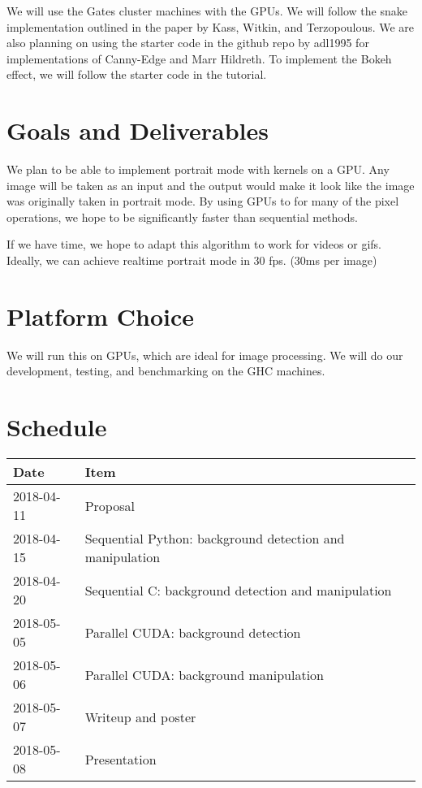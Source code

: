 \documentclass[12pt]{article}
\begin{document}
We will use the Gates cluster machines with the GPUs. We will follow the snake
implementation outlined in the paper by Kass, Witkin, and Terzopoulous.
\cite{paper} We are also planning on using the starter code in the github repo
by adl1995 for implementations of Canny-Edge and Marr Hildreth. \cite{edge} To
implement the Bokeh effect, we will follow the starter code in the tutorial.
\cite{bokeh}

\section{Goals and Deliverables}

We plan to be able to implement portrait mode with kernels on a GPU. Any image
will be taken as an input and the output would make it look like the image was
originally taken in portrait mode. By using GPUs to for many of the pixel
operations, we hope to be significantly faster than sequential methods.

If we have time, we hope to adapt this algorithm to work for videos or gifs.
Ideally, we can achieve realtime portrait mode in 30 fps. (30ms per image)

\section{Platform Choice}

We will run this on GPUs, which are ideal for image processing. We will do our
development, testing, and benchmarking on the GHC machines.

\section{Schedule}

\begin{tabular}{l|l}
    Date & Item \\
    \hline
    2018-04-11 & Proposal \\
    2018-04-15 & Sequential Python: background detection and manipulation \\
    2018-04-20 & Sequential C: background detection and manipulation \\
    2018-05-05 & Parallel CUDA: background detection \\
    2018-05-06 & Parallel CUDA: background manipulation \\
    2018-05-07 & Writeup and poster \\
    2018-05-08 & Presentation
\end{tabular}

\end{document}
